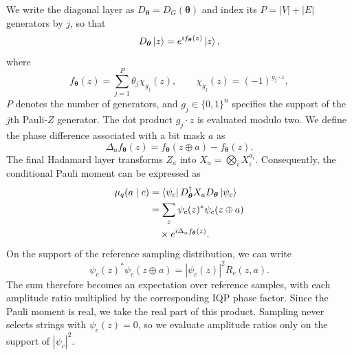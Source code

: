 \documentclass[pra,aps,10pt,twocolumn,floatfix,superscriptaddress, notitlepage,longbibliography]{revtex4-2}
\begin{document}
We write the diagonal layer as $D_{\boldsymbol\theta}=D_G(\boldsymbol\theta)$ and index its $P=|V|+|E|$ generators by $j$, so that
\begin{equation}
    D_{\boldsymbol{\theta}}\ket{z}
    =
    e^{if_{\boldsymbol{\theta}}(z)}\ket{z},
\end{equation}
where
\begin{equation}
    f_{\boldsymbol{\theta}}(z)
    =
    \sum_{j=1}^{P}
    \theta_j\chi_{g_j}(z),
    \qquad
    \chi_{g_j}(z)=(-1)^{g_j\cdot z},
    \label{eq:iqp-phase-function}
\end{equation}
$P$ denotes the number of generators, and $g_j\in\{0,1\}^n$ specifies the support of the $j$th Pauli-$Z$ generator. The dot product $g_j\cdot z$ is evaluated modulo two. We define the phase difference associated with a bit mask $a$ as
\begin{equation}
    \Delta_a f_{\boldsymbol{\theta}}(z)
    =
    f_{\boldsymbol{\theta}}(z\oplus a)
    -
    f_{\boldsymbol{\theta}}(z).
    \label{eq:conditional-phase-difference}
\end{equation}
The final Hadamard layer transforms $Z_a$ into $X_a=\bigotimes_i X_i^{a_i}$. Consequently, the conditional Pauli moment can be expressed as
\begin{equation}
\begin{aligned}
    \mu_q(a\mid c)
    &=\bra{\psi_c}D_{\boldsymbol\theta}^{\dagger}X_aD_{\boldsymbol\theta}\ket{\psi_c}\\
    &=\sum_z \psi_c(z)^*\psi_c(z\oplus a)\\
    &\quad\times e^{i\Delta_a f_{\boldsymbol\theta}(z)}.
\end{aligned}
\label{eq:conditional-moment-expansion}
\end{equation}
On the support of the reference sampling distribution, we can write
\begin{equation}
    \psi_c(z)^*\psi_c(z\oplus a)=|\psi_c(z)|^2 R_c(z,a).
\end{equation}
The sum therefore becomes an expectation over reference samples, with each amplitude ratio multiplied by the corresponding IQP phase factor. Since the Pauli moment is real, we take the real part of this product. Sampling never selects strings with $\psi_c(z)=0$, so we evaluate amplitude ratios only on the support of $|\psi_c|^2$.
\end{document}
